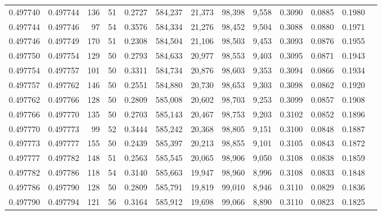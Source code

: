 \begin{tabular}{rrrrrrrrrrrrr}
0.497740 & 0.497744 &   136 &  51 &                                     0.2727 & 584,237 &  21,373 &  98,398 &   9,558 & 0.3090 & 0.0885 & 0.1980 \\
0.497744 & 0.497746 &    97 &  54 &                                     0.3576 & 584,334 &  21,276 &  98,452 &   9,504 & 0.3088 & 0.0880 & 0.1971 \\
0.497746 & 0.497749 &   170 &  51 &                                     0.2308 & 584,504 &  21,106 &  98,503 &   9,453 & 0.3093 & 0.0876 & 0.1955 \\
0.497750 & 0.497754 &   129 &  50 &                                     0.2793 & 584,633 &  20,977 &  98,553 &   9,403 & 0.3095 & 0.0871 & 0.1943 \\
0.497754 & 0.497757 &   101 &  50 &                                     0.3311 & 584,734 &  20,876 &  98,603 &   9,353 & 0.3094 & 0.0866 & 0.1934 \\
0.497757 & 0.497762 &   146 &  50 &                                     0.2551 & 584,880 &  20,730 &  98,653 &   9,303 & 0.3098 & 0.0862 & 0.1920 \\
0.497762 & 0.497766 &   128 &  50 &                                     0.2809 & 585,008 &  20,602 &  98,703 &   9,253 & 0.3099 & 0.0857 & 0.1908 \\
0.497766 & 0.497770 &   135 &  50 &                                     0.2703 & 585,143 &  20,467 &  98,753 &   9,203 & 0.3102 & 0.0852 & 0.1896 \\
0.497770 & 0.497773 &    99 &  52 &                                     0.3444 & 585,242 &  20,368 &  98,805 &   9,151 & 0.3100 & 0.0848 & 0.1887 \\
0.497773 & 0.497777 &   155 &  50 &                                     0.2439 & 585,397 &  20,213 &  98,855 &   9,101 & 0.3105 & 0.0843 & 0.1872 \\
0.497777 & 0.497782 &   148 &  51 &                                     0.2563 & 585,545 &  20,065 &  98,906 &   9,050 & 0.3108 & 0.0838 & 0.1859 \\
0.497782 & 0.497786 &   118 &  54 &                                     0.3140 & 585,663 &  19,947 &  98,960 &   8,996 & 0.3108 & 0.0833 & 0.1848 \\
0.497786 & 0.497790 &   128 &  50 &                                     0.2809 & 585,791 &  19,819 &  99,010 &   8,946 & 0.3110 & 0.0829 & 0.1836 \\
0.497790 & 0.497794 &   121 &  56 &                                     0.3164 & 585,912 &  19,698 &  99,066 &   8,890 & 0.3110 & 0.0823 & 0.1825 \\

\end{tabular}
